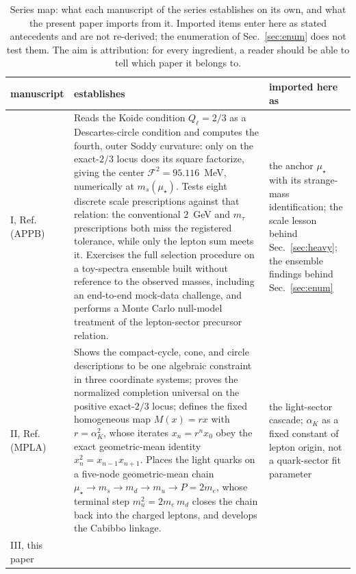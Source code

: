 \documentclass[aps,twocolumn,superscriptaddress,nofootinbib,floatfix]{revtex4-2}
\newcommand{\mstar}{\mu_\star}
\newcommand{\alphaK}{\alpha_K}
\begin{document}
\begin{table}[t]
\caption{Series map: what each manuscript of the series establishes on its own, and what the present paper imports from it. Imported items enter here as stated antecedents and are not re-derived; the enumeration of Sec.~\ref{sec:enum} does not test them. The aim is attribution: for every ingredient, a reader should be able to tell which paper it belongs to.}
\label{tab:series}
\begin{ruledtabular}
\begin{tabular}{p{}p{}p{}}
manuscript & establishes & imported here as \\
\hline
I, Ref.~\cite{BrilliantAPPB} (APPB) &
Reads the Koide condition $Q_\ell=2/3$ as a Descartes-circle condition and computes the fourth, outer Soddy curvature: only on the exact-$2/3$ locus does its square factorize, giving the center $\mathcal F^2=95.116$~MeV, numerically at $m_s(\mstar)$. Tests eight discrete scale prescriptions against that relation: the conventional $2$~GeV and $m_\tau$ prescriptions both miss the registered tolerance, while only the lepton sum meets it. Exercises the full selection procedure on a toy-spectra ensemble built without reference to the observed masses, including an end-to-end mock-data challenge, and performs a Monte Carlo null-model treatment of the lepton-sector precursor relation. &
the anchor $\mstar$ with its strange-mass identification; the scale lesson behind Sec.~\ref{sec:heavy}; the ensemble findings behind Sec.~\ref{sec:enum} \\
II, Ref.~\cite{BrilliantMPLA} (MPLA) &
Shows the compact-cycle, cone, and circle descriptions to be one algebraic constraint in three coordinate systems; proves the normalized completion universal on the positive exact-$2/3$ locus; defines the fixed homogeneous map $M(x)=rx$ with $r=\alphaK^2$, whose iterates $x_n=r^nx_0$ obey the exact geometric-mean identity $x_n^2=x_{n-1}x_{n+1}$. Places the light quarks on a five-node geometric-mean chain $\mstar\to m_s\to m_d\to m_u\to P=2m_e$, whose terminal step $m_u^2=2m_e\,m_d$ closes the chain back into the charged leptons, and develops the Cabibbo linkage. &
the light-sector cascade; $\alphaK$ as a fixed constant of lepton origin, not a quark-sector fit parameter \\
III, this paper &

\end{tabular}
\end{ruledtabular}
\end{table}
\end{document}

